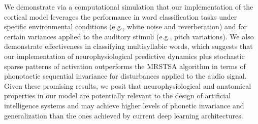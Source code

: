 \documentclass[10pt,letterpaper]{article}
\begin{document}
We demonstrate via a computational simulation that our implementation of the cortical model leverages the performance in word classification tasks under specific environmental conditions (e.g., white noise and reverberation) and for certain variances applied to the auditory stimuli (e.g., pitch variations). We also demonstrate effectiveness in classifying multisyllabic words, which suggests that our implementation of neurophysiological predictive dynamics plus stochastic sparse patterns of activation outperforms the MRSTSA algorithm in terms of phonotactic sequential invariance for disturbances applied to the audio signal. Given these promising results, we posit that neurophysiological and anatomical properties in our model are potentially relevant to the design of artificial intelligence systems and may achieve higher levels of phonetic invariance and generalization than the ones achieved by current deep learning architectures.




\end{document}
